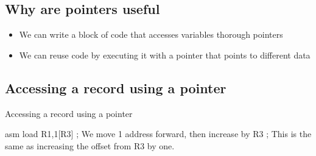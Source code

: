 \subsection{Why are pointers useful}\label{sub:why_are_pointers_useful}

\begin{itemize}
	\item We can write a block of code that accesses variables thorough pointers
	\item We can reuse code by executing it with a pointer that points to different data
\end{itemize}

\subsection{Accessing a record using a pointer}\label{sub:accessing_a_record_using_a_pointer}

\begin{highlight}{Accessing a record using a pointer}
	\begin{code}{asm}
		load R1,1[R3] ; We move 1 address forward, then increase by R3
		; This is the same as increasing the offset from R3 by one.
	\end{code}
\end{highlight}

